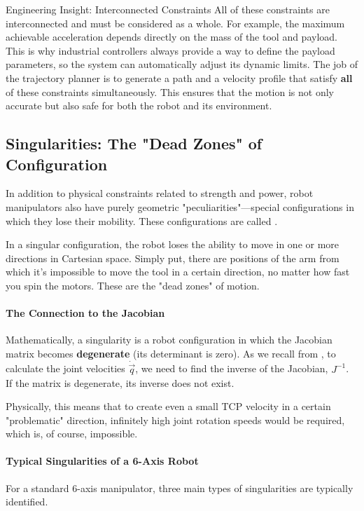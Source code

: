\begin{tipbox}{Engineering Insight: Interconnected Constraints}
All of these constraints are interconnected and must be considered as a whole. For example, the maximum achievable acceleration depends directly on the mass of the tool and payload. This is why industrial controllers always provide a way to define the payload parameters, so the system can automatically adjust its dynamic limits. The job of the trajectory planner is to generate a path and a velocity profile that satisfy \textbf{all} of these constraints simultaneously. This ensures that the motion is not only accurate but also safe for both the robot and its environment.
\end{tipbox}

\subsection{Singularities: The "Dead Zones" of Configuration}
\label{sec:singularities}

In addition to physical constraints related to strength and power, robot manipulators also have purely geometric "peculiarities"—special configurations in which they lose their mobility. These configurations are called .

In a singular configuration, the robot loses the ability to move in one or more directions in Cartesian space. Simply put, there are positions of the arm from which it's impossible to move the tool in a certain direction, no matter how fast you spin the motors. These are the "dead zones" of motion.

\paragraph{The Connection to the Jacobian}
Mathematically, a singularity is a robot configuration in which the Jacobian matrix becomes \textbf{degenerate} (its determinant is zero). As we recall from , to calculate the joint velocities $\dot{\vec{q}}$, we need to find the inverse of the Jacobian, $J^{-1}$. If the matrix is degenerate, its inverse does not exist.

Physically, this means that to create even a small TCP velocity in a certain "problematic" direction, infinitely high joint rotation speeds would be required, which is, of course, impossible.

\paragraph{Typical Singularities of a 6-Axis Robot}
For a standard 6-axis manipulator, three main types of singularities are typically identified.

